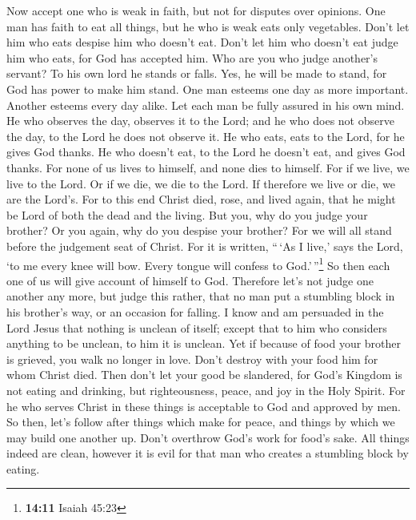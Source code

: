  Now accept one who is weak in faith, but not for disputes
over opinions.  One man has faith to eat all things, but
he who is weak eats only vegetables.  Don't let him who
eats despise him who doesn't eat. Don't let him who doesn't eat judge
him who eats, for God has accepted him.  Who are you who
judge another's servant? To his own lord he stands or falls. Yes, he
will be made to stand, for God has power to make him stand.
 One man esteems one day as more important. Another
esteems every day alike. Let each man be fully assured in his own mind.
 He who observes the day, observes it to the Lord; and he
who does not observe the day, to the Lord he does not observe it. He who
eats, eats to the Lord, for he gives God thanks. He who doesn't eat, to
the Lord he doesn't eat, and gives God thanks.  For none
of us lives to himself, and none dies to himself.  For if
we live, we live to the Lord. Or if we die, we die to the Lord. If
therefore we live or die, we are the Lord's.  For to this
end Christ died, rose, and lived again, that he might be Lord of both
the dead and the living.  But you, why do you judge your
brother? Or you again, why do you despise your brother? For we will all
stand before the judgement seat of Christ.  For it is
written, ``\,`As I live,' says the Lord, `to me every knee will bow.
Every tongue will confess to God.'\,''\footnote{\textbf{14:11} Isaiah
  45:23}  So then each one of us will give account of
himself to God.  Therefore let's not judge one another
any more, but judge this rather, that no man put a stumbling block in
his brother's way, or an occasion for falling.  I know
and am persuaded in the Lord Jesus that nothing is unclean of itself;
except that to him who considers anything to be unclean, to him it is
unclean.  Yet if because of food your brother is grieved,
you walk no longer in love. Don't destroy with your food him for whom
Christ died.  Then don't let your good be slandered,
 for God's Kingdom is not eating and drinking, but
righteousness, peace, and joy in the Holy Spirit.  For he
who serves Christ in these things is acceptable to God and approved by
men.  So then, let's follow after things which make for
peace, and things by which we may build one another up. 
Don't overthrow God's work for food's sake. All things indeed are clean,
however it is evil for that man who creates a stumbling block by eating.

